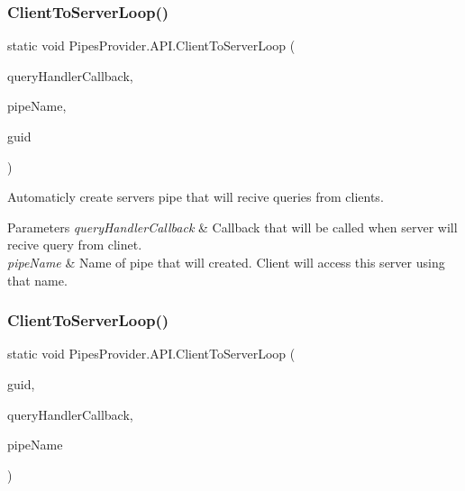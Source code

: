 \subsubsection{\texorpdfstring{Client\+To\+Server\+Loop()}{ClientToServerLoop()}\hspace{0.1cm}{\footnotesize\ttfamily [1/4]}}
{\footnotesize\ttfamily static void Pipes\+Provider.\+A\+P\+I.\+Client\+To\+Server\+Loop (\begin{DoxyParamCaption}\item[{System.\+Action$<$ \mbox{\hyperlink{class_pipes_provider_1_1_server_transmission_meta}{Server\+Transmission\+Meta}}, string $>$}]{query\+Handler\+Callback,  }\item[{string}]{pipe\+Name,  }\item[{out string}]{guid }\end{DoxyParamCaption})\hspace{0.3cm}{\ttfamily [static]}}



Automaticly create server\textquotesingle{}s pipe that will recive queries from clients. 


\begin{DoxyParams}{Parameters}
{\em query\+Handler\+Callback} & Callback that will be called when server will recive query from clinet.\\
\hline
{\em pipe\+Name} & Name of pipe that will created. Client will access this server using that name.\\
\hline
\end{DoxyParams}
\mbox{\label{class_pipes_provider_1_1_a_p_i_a06ee04a0e80238a176b7b2cac3f6bb4b}} 
\subsubsection{\texorpdfstring{Client\+To\+Server\+Loop()}{ClientToServerLoop()}\hspace{0.1cm}{\footnotesize\ttfamily [2/4]}}
{\footnotesize\ttfamily static void Pipes\+Provider.\+A\+P\+I.\+Client\+To\+Server\+Loop (\begin{DoxyParamCaption}\item[{string}]{guid,  }\item[{System.\+Action$<$ \mbox{\hyperlink{class_pipes_provider_1_1_server_transmission_meta}{Server\+Transmission\+Meta}}, string $>$}]{query\+Handler\+Callback,  }\item[{string}]{pipe\+Name }\end{DoxyParamCaption})\hspace{0.3cm}{\ttfamily [static]}}



